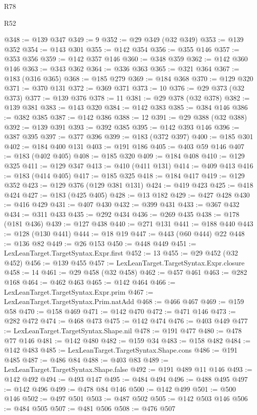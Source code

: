 \begin{lexlean}{R78}
\begin{lexlean}{R52}
\begin{coremodule}
{{{{{{{{{{{{{{{{{{{{{{{{{{{{{{{{{{{{{{{{{{{{{{{{{{{{{{{{{{{{{{{{{{{{{{{{{{{{{{{{{{{{{{{{{{{{{{{{{{{{{{{{{{{{{{{{{{{{{{{{{{{{{{{{{{{{{{{{{{{{{{{{{{{{{{{{{{{{{{{{{{{{{{{{{{{{{{{{{{{{{{{{{{{{{{{{{{{{{{@348 := @139 @347
@349 := 9
@352 := @29 @349 (@32 @349)
@353 := @139 @352
@354 := @143 @301
@355 := @142 @354
@356 := @355 @146
@357 := @353 @356
@359 := @142 @357 @146
@360 := @348 @359
@362 := @142 @360 @146
@363 := @343 @362
@364 := @336 @363
@365 := @321 @364
@367 := @183 (@316 @365)
@368 := @185 @279
@369 := @184 @368
@370 := @129 @320
@371 := @370 @131
@372 := @369 @371
@373 := 10
@376 := @29 @373 (@32 @373)
@377 := @139 @376
@378 := 11
@381 := @29 @378 (@32 @378)
@382 := @139 @381
@383 := @143 @320
@384 := @142 @383
@385 := @384 @146
@386 := @382 @385
@387 := @142 @386
@388 := 12
@391 := @29 @388 (@32 @388)
@392 := @139 @391
@393 := @392 @385
@395 := @142 @393 @146
@396 := @387 @395
@397 := @377 @396
@399 := @183 (@372 @397)
@400 := @185 @301
@402 := @184 @400 @131
@403 := @191 @186
@405 := @403 @59 @146
@407 := @183 (@402 @405)
@408 := @185 @320
@409 := @184 @408
@410 := @129 @325
@411 := @129 @347
@413 := @410 (@411 @131)
@414 := @409 @413
@416 := @183 (@414 @405)
@417 := @185 @325
@418 := @184 @417
@419 := @129 @352
@423 := @129 @376 (@129 @381 @131)
@424 := @419 @423
@425 := @418 @424
@427 := @183 (@425 @405)
@428 := @13 @182
@429 := @427 @428
@430 := @416 @429
@431 := @407 @430
@432 := @399 @431
@433 := @367 @432
@434 := @311 @433
@435 := @292 @434
@436 := @269 @435
@438 := @178 (@181 @436)
@439 := @127 @438
@440 := @271 @131
@441 := @188 @440
@443 := @128 (@130 @441)
@444 := @18 @19
@447 := @443 (@60 @444) @22
@448 := @136 @82
@449 := @26 @153
@450 := @448 @449
@451 := LexLeanTarget.TargetSyntax.Expr.first
@452 := 13
@455 := @29 @452 (@32 @452)
@456 := @139 @455
@457 := LexLeanTarget.TargetSyntax.Expr.closure
@458 := 14
@461 := @29 @458 (@32 @458)
@462 := @457 @461
@463 := @282 @168
@464 := @462 @463
@465 := @142 @464
@466 := LexLeanTarget.TargetSyntax.Expr.prim
@467 := LexLeanTarget.TargetSyntax.Prim.natAdd
@468 := @466 @467
@469 := @159 @58
@470 := @158 @469
@471 := @142 @470
@472 := @471 @146
@473 := @282 @472
@474 := @468 @473
@475 := @142 @474
@476 := @403 @449
@477 := LexLeanTarget.TargetSyntax.Shape.nil
@478 := @191 @477
@480 := @478 @77 @146
@481 := @142 @480
@482 := @159 @34
@483 := @158 @482
@484 := @142 @483
@485 := LexLeanTarget.TargetSyntax.Shape.cons
@486 := @191 @485
@487 := @486 @84
@488 := @403 @83
@489 := LexLeanTarget.TargetSyntax.Shape.false
@492 := @191 @489 @11 @146
@493 := @142 @492
@494 := @493 @147
@495 := @484 @494
@496 := @488 @495
@497 := @142 @496
@499 := @478 @84 @146
@500 := @142 @499
@501 := @500 @146
@502 := @497 @501
@503 := @487 @502
@505 := @142 @503 @146
@506 := @484 @505
@507 := @481 @506
@508 := @476 @507
}}}}}}}}}}}}}}}}}}}}}}}}}}}}}}}}}}}}}}}}}}}}}}}}}}}}}}}}}}}}}}}}}}}}}}}}}}}}}}}}}}}}}}}}}}}}}}}}}}}}}}}}}}}}}}}}}}}}}}}}}}}}}}}}}}}}}}}}}}}}}}}}}}}}}}}}}}}}}}}}}}}}}}}}}}}}}}}}}}}}}}}}}}}}}}}}}}}}}}
\end{coremodule}
\end{lexlean}
\end{lexlean}

